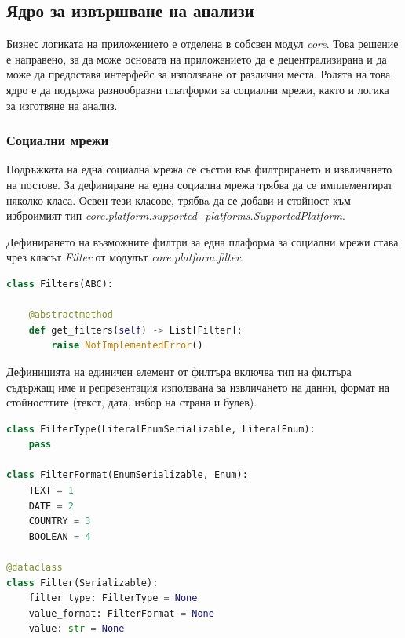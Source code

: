 \documentclass{article}
\newcounter{subsubsubsection}[subsubsection]
\begin{document}
\subsection{Ядро за извършване на анализи}

Бизнес логиката на приложението е отделена в собсвен модул \textit{core}. Това решение е направено, за да може основата
на приложението да е децентрализирана и да може да предоставя интерфейс за използване от различни места. Ролята на това
ядро е да подържа разнообразни платформи за социални мрежи, както и логика за изготвяне на анализ.

\subsubsection{Социални мрежи}

Подръжката на една социална мрежа се състои във филтрирането и извличането на постове. За дефиниране на една социална
мрежа трябва да се имплементират няколко класа. Освен тези класове, трябвa да се добави и стойност към изброимият тип
\textit{core.platform.supported\_platforms.SupportedPlatform}.


Дефинирането на възможните филтри за една плаформа за социални мрежи става чрез класът \textit{Filter} от модулът
\textit{core.platform.filter}.

\begin{lstlisting}[language=Python, caption=Абстрактен клас дефиниращ интерфейс за задаване на възможни филтри.]
class Filters(ABC):

    @abstractmethod
    def get_filters(self) -> List[Filter]:
        raise NotImplementedError()
\end{lstlisting}

Дефиницията на единичен елемент от филтъра включва тип на филтъра съдържащ име и репрезентация използвана за
извличането на данни, формат на стойносттите (текст, дата, избор на страна и булев).

\begin{lstlisting}[language=Python, caption=Класове дефиниращи елемент от филтъра.]
class FilterType(LiteralEnumSerializable, LiteralEnum):
    pass

class FilterFormat(EnumSerializable, Enum):
    TEXT = 1
    DATE = 2
    COUNTRY = 3
    BOOLEAN = 4

@dataclass
class Filter(Serializable):
    filter_type: FilterType = None
    value_format: FilterFormat = None
    value: str = None
\end{lstlisting}
\end{document}
